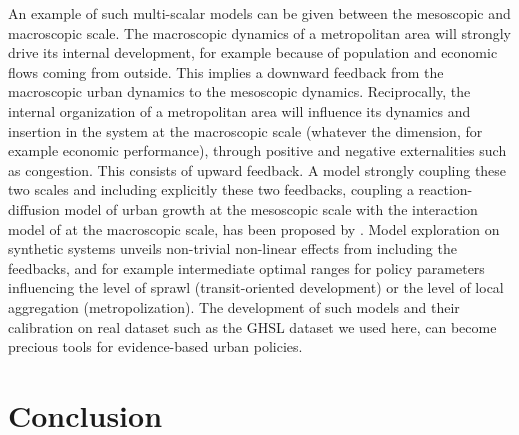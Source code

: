 \documentclass[11pt]{article}
\begin{document}
An example of such multi-scalar models can be given between the mesoscopic and macroscopic scale. The macroscopic dynamics of a metropolitan area will strongly drive its internal development, for example because of population and economic flows coming from outside. This implies a downward feedback from the macroscopic urban dynamics to the mesoscopic dynamics. Reciprocally, the internal organization of a metropolitan area will influence its dynamics and insertion in the system at the macroscopic scale (whatever the dimension, for example economic performance), through positive and negative externalities such as congestion. This consists of upward feedback. A model strongly coupling these two scales and including explicitly these two feedbacks, coupling a reaction-diffusion model of urban growth at the mesoscopic scale \cite{raimbault2018calibration} with the interaction model of \cite{raimbault2020indirect} at the macroscopic scale, has been proposed by \cite{raimbault2019multiscalar}. Model exploration on synthetic systems unveils non-trivial non-linear effects from including the feedbacks, and for example intermediate optimal ranges for policy parameters influencing the level of sprawl (transit-oriented development) or the level of local aggregation (metropolization). The development of such models and their calibration on real dataset such as the GHSL dataset we used here, can become precious tools for evidence-based urban policies.




\section{Conclusion}
\end{document}
